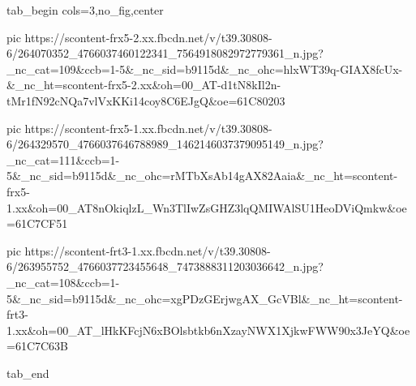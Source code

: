  
 
 
 
 


\ifcmt
  tab_begin cols=3,no_fig,center

     pic https://scontent-frx5-2.xx.fbcdn.net/v/t39.30808-6/264070352_4766037460122341_7564918082972779361_n.jpg?_nc_cat=109&ccb=1-5&_nc_sid=b9115d&_nc_ohc=hlxWT39q-GIAX8fcUx-&_nc_ht=scontent-frx5-2.xx&oh=00_AT-d1tN8kIl2n-tMr1fN92cNQa7vlVxKKi14coy8C6EJgQ&oe=61C80203

     pic https://scontent-frx5-1.xx.fbcdn.net/v/t39.30808-6/264329570_4766037646788989_1462146037379095149_n.jpg?_nc_cat=111&ccb=1-5&_nc_sid=b9115d&_nc_ohc=rMTbXsAb14gAX82Aaia&_nc_ht=scontent-frx5-1.xx&oh=00_AT8nOkiqlzL_Wn3TlIwZsGHZ3lqQMIWAlSU1HeoDViQmkw&oe=61C7CF51

     pic https://scontent-frt3-1.xx.fbcdn.net/v/t39.30808-6/263955752_4766037723455648_7473888311203036642_n.jpg?_nc_cat=108&ccb=1-5&_nc_sid=b9115d&_nc_ohc=xgPDzGErjwgAX_GcVBl&_nc_ht=scontent-frt3-1.xx&oh=00_AT_lHkKFcjN6xBOlsbtkb6nXzayNWX1XjkwFWW90x3JeYQ&oe=61C7C63B

  tab_end
\fi
